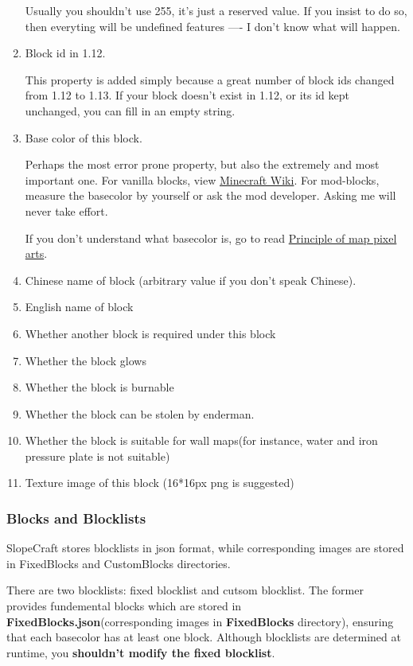 \documentclass{article}
\begin{document}
\begin{enumerate}
   Usually you shouldn't use 255, it's just a reserved value. If you insist to do so, then everyting will be undefined features ---- I don't know what will happen.

   \item Block id in 1.12.
   
   This property is added simply because a great number of block ids changed from 1.12 to 1.13. If your block doesn't exist in 1.12, or its id kept unchanged, you can fill in an empty string.
   
   \item Base color of this block.
   
   Perhaps the most error prone property, but also the extremely and most important one. For vanilla blocks, view \href{https://minecraft.fandom.com/wiki/Map_item_format}{Minecraft Wiki}. For mod-blocks, measure the basecolor by yourself or ask the mod developer. Asking me will never take effort.
   
   If you don't understand what basecolor is, go to read \href{https://github.com/ToKiNoBug/SlopeCraftTutorial/blob/main/BasicPrinciple/Principle%20of%20map%20pixel%20arts.md}{Principle of map pixel arts}.

   \item Chinese name of block (arbitrary value if you don't speak Chinese).
   \item English name of block
   \item Whether another block is required under this block
   \item Whether the block glows
   \item Whether the block is burnable
   \item Whether the block can be stolen by enderman.
   \item Whether the block is suitable for wall maps(for instance, water and iron pressure plate is not suitable)
   \item Texture image of this block (16*16px png is suggested)  
   \end{enumerate}

   \subsubsection{Blocks and Blocklists}
   SlopeCraft stores blocklists in json format, while corresponding images are stored in FixedBlocks and CustomBlocks directories.
   
   There are two blocklists: fixed blocklist and cutsom blocklist. The former provides fundemental blocks which are stored in \textbf{FixedBlocks.json}(corresponding images in \textbf{FixedBlocks} directory), ensuring that each basecolor has at least one block. Although blocklists are determined at runtime, you \textbf{shouldn't modify the fixed blocklist}.
   
\end{document}

